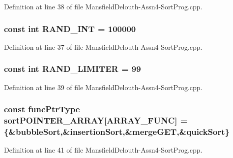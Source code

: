 Definition at line 38 of file MansfieldDelouth-\/Assn4-\/SortProg.cpp.

\hypertarget{_mansfield_delouth-_assn4-_sort_prog_8cpp_a134c2ba56ae9ba89c77a5c0dba9f2124}{
\subsubsection[{RAND\_\-INT}]{\setlength{\rightskip}{0pt plus 5cm}const int {\bf RAND\_\-INT} = 100000}}
\label{_mansfield_delouth-_assn4-_sort_prog_8cpp_a134c2ba56ae9ba89c77a5c0dba9f2124}


Definition at line 37 of file MansfieldDelouth-\/Assn4-\/SortProg.cpp.

\hypertarget{_mansfield_delouth-_assn4-_sort_prog_8cpp_ad454298170f7805366a1aa2da04df23a}{
\subsubsection[{RAND\_\-LIMITER}]{\setlength{\rightskip}{0pt plus 5cm}const int {\bf RAND\_\-LIMITER} = 99}}
\label{_mansfield_delouth-_assn4-_sort_prog_8cpp_ad454298170f7805366a1aa2da04df23a}


Definition at line 39 of file MansfieldDelouth-\/Assn4-\/SortProg.cpp.

\hypertarget{_mansfield_delouth-_assn4-_sort_prog_8cpp_ae039780346621e190c7726c08c9a1a13}{
\subsubsection[{sortPOINTER\_\-ARRAY}]{\setlength{\rightskip}{0pt plus 5cm}const {\bf funcPtrType} {\bf sortPOINTER\_\-ARRAY}\mbox{[}{\bf ARRAY\_\-FUNC}\mbox{]} = \{\&bubbleSort,\&insertionSort,\&mergeGET,\&quickSort\}}}
\label{_mansfield_delouth-_assn4-_sort_prog_8cpp_ae039780346621e190c7726c08c9a1a13}


Definition at line 41 of file MansfieldDelouth-\/Assn4-\/SortProg.cpp.

